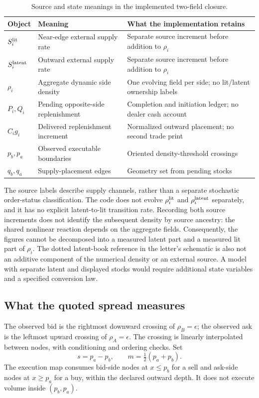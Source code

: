 \documentclass[11pt,a4paper]{article}
\begin{document}
\begin{table}[htbp]\centering\small
\caption{Source and state meanings in the implemented two-field closure.}\label{tab:source-state}
\begin{tabularx}{\textwidth}{@{}lYY@{}}\toprule
Object & Meaning & What the implementation retains\\\midrule
$S_i^{\rm lit}$ & Near-edge external supply rate & Separate source increment before addition to $\rho_i$\\
$S_i^{\rm latent}$ & Outward external supply rate & Separate source increment before addition to $\rho_i$\\
$\rho_i$ & Aggregate dynamic side density & One evolving field per side; no lit/latent ownership labels\\
$P_i,Q_i$ & Pending opposite-side replenishment & Completion and initiation ledger; no dealer cash account\\
$C_i g_i$ & Delivered replenishment increment & Normalized outward placement; no second trade print\\
$p_b,p_a$ & Observed executable boundaries & Oriented density-threshold crossings\\
$q_b,q_a$ & Supply-placement edges & Geometry set from pending stocks\\\bottomrule
\end{tabularx}\end{table}

The source labels describe supply channels, rather than a separate stochastic order-status classification. The code does not evolve $\rho_i^{\rm lit}$ and $\rho_i^{\rm latent}$ separately, and it has no explicit latent-to-lit transition rate. Recording both source increments does not identify the subsequent density by source ancestry: the shared nonlinear reaction depends on the aggregate fields. Consequently, the figures cannot be decomposed into a measured latent part and a measured lit part of $\rho_i$. The dotted latent-book reference in the letter's schematic is also not an additive component of the numerical density or an external source. A model with separate latent and displayed stocks would require additional state variables and a specified conversion law.

\subsection{What the quoted spread measures}\label{sec:spread}
The observed bid is the rightmost downward crossing of $\rho_B=\epsilon$; the observed ask is the leftmost upward crossing of $\rho_A=\epsilon$. The crossing is linearly interpolated between nodes, with conditioning and ordering checks. Set
\begin{equation}\label{eq:quotes}
s=p_a-p_b,\qquad m=\tfrac12(p_a+p_b).
\end{equation}
The execution map consumes bid-side nodes at $x\leq p_b$ for a sell and ask-side nodes at $x\geq p_a$ for a buy, within the declared outward depth. It does not execute volume inside $(p_b,p_a)$.
\end{document}
